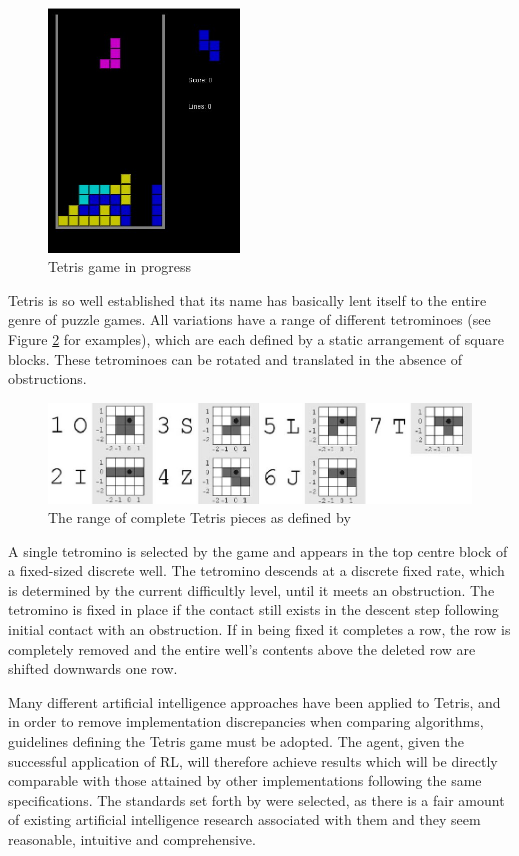 \documentclass{rucsthesis}
\begin{document}
\begin{figure}[h]
\centering%
\includegraphics[width=2in]{tetgame.jpg}
\caption{Tetris game in progress}
\label{fig:tetgame}
\end{figure}

Tetris is so well established that its name has basically lent itself to the entire genre of puzzle games. All variations have a range of different tetrominoes (see Figure \ref{fig:pieces} for examples), which are each defined by a static arrangement of square blocks. These tetrominoes can be rotated and translated in the absence of obstructions. 

\begin{figure}[h]
\centering
\includegraphics[width=\textwidth]{tetrisblocks.jpg}
\caption{The range of complete Tetris pieces as defined by \cite{tetstand}}
\label{fig:pieces}
\end{figure}
 
A  single tetromino is selected by the game and appears in the top centre block of a fixed-sized discrete well. The tetromino descends at a discrete fixed rate, which is determined by the current difficultly level, until it meets an obstruction. The tetromino is fixed in place if the contact still exists in the descent step following initial contact with an obstruction. If in being fixed it completes a row, the row is completely removed and the entire well's contents above the deleted row are shifted downwards one row.

Many different artificial intelligence approaches have been applied to Tetris, and in order to remove implementation discrepancies when comparing algorithms, guidelines defining the Tetris game must be adopted. The agent, given the successful application of RL, will therefore achieve results which will be directly comparable with those attained by other implementations following the same specifications. The standards set forth by \cite{tetstand} were selected, as there is a fair amount of existing artificial intelligence research associated with them and they seem reasonable, intuitive and comprehensive.
\end{document}
